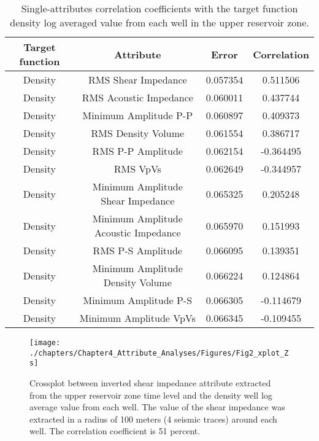 \begin{table} \label{Single-attributes correlation coefficients. } 
\begin{center} 
\begin{tabular}{| c | c | c | c | } 
\hline 
Target function                & Attribute  & Error  & Correlation     \\ 
\hline 
Density         &  RMS Shear Impedance        &  0.057354  &  0.511506        \\ 
\hline 
Density         & RMS Acoustic Impedance     &  0.060011 & 0.437744   \\ 
\hline 
Density        &  Minimum Amplitude P-P        & 0.060897 & 0.409373     \\ 
\hline
Density        &  RMS Density Volume             & 0.061554 & 0.386717\\
\hline   
Density        &    RMS P-P  Amplitude                               & 0.062154 & -0.364495 \\
\hline 
Density        & RMS VpVs                                      & 0.062649  & -0.344957     \\ 
\hline 
Density         &  Minimum Amplitude Shear Impedance      &  0.065325  &  0.205248        \\ 
\hline 
Density         & Minimum Amplitude Acoustic Impedance     &  0.065970 & 0.151993   \\ 
\hline 
Density        &  RMS P-S  Amplitude                                   & 0.066095 & 0.139351     \\ 
\hline
Density       &  Minimum Amplitude Density Volume  & 0.066224 & 0.124864\\
\hline
Density      &    Minimum Amplitude P-S   & 0.066305 & -0.114679 \\
\hline
Density      &    Minimum Amplitude VpVs   & 0.066345 & -0.109455 \\
\hline 
\end{tabular} 
\caption{Single-attributes correlation coefficients with the target function density log averaged value from each well in the upper reservoir zone.} 
\end{center} 
\end{table}





\begin{figure}[hbtp]
	\begin{center}
	\texttt{[image: ./chapters/Chapter4\_Attribute\_Analyses/Figures/Fig2\_xplot\_Zs]}
			\caption[Crossplot between shear impedance attribute and density well log average value from each well.]{Crossplot between inverted shear impedance attribute extracted from the upper reservoir zone time level  and the density well log average value from each well. The value of the shear impedance was extracted in a radius of 100 meters (4 seismic traces) around each well. The correlation coefficient is 51 percent.}
			\label{fig:xplot_zs}
		\end{center}
	\end{figure}	
	
